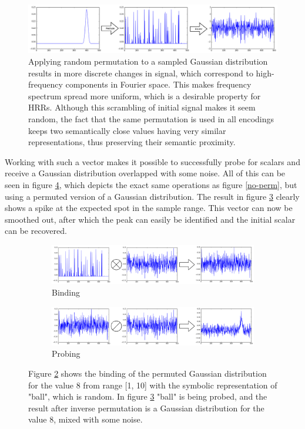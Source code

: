 \documentclass[conference]{IEEEtran}
\begin{document}
	\begin{figure}
		\includegraphics[width=\columnwidth]{img/scalar-perm-step-fft.png}
		\caption{Applying random permutation to a sampled Gaussian distribution results in more discrete changes in signal, which correspond to high-frequency components in Fourier space. This makes frequency spectrum spread more uniform, which is a desirable property for HRRs. Although this scrambling of initial signal makes it seem random, the fact that the same permutation is used in all encodings keeps two semantically close values having very similar representations, thus preserving their semantic proximity. }
		\label{perm-fft}
	\end{figure}
	
	Working with such a vector makes it possible to successfully probe for scalars and receive a Gaussian distribution overlapped with some noise.
All of this can be seen in figure \ref{perm}, which depicts the exact same operations as figure \ref{no-perm}, but using a permuted version of a Gaussian distribution.
The result in figure \ref{perm-b} clearly shows a spike at the expected spot in the sample range.
This vector can now be smoothed out, after which the peak can easily be identified and the initial scalar can be recovered.
	
	\begin{figure}
		\begin{subfigure}{1\columnwidth}
			\includegraphics[width=\columnwidth]{img/scalar-post-perm.png}
			\caption{Binding}
			\label{perm-a}
		\end{subfigure}
		\begin{subfigure}{1\columnwidth}
			\includegraphics[width=\columnwidth]{img/scalar-post-perm-probe.png}
			\caption{Probing}
			\label{perm-b}
		\end{subfigure}
		\caption{Figure \ref{perm-a} shows the binding of the permuted Gaussian distribution for the value 8 from range [1, 10] with the symbolic representation of "ball", which is random.
In figure \ref{perm-b} "ball" is being probed, and the result after inverse permutation is a Gaussian distribution for the value 8, mixed with some noise.}
		\label{perm}
	\end{figure}
	
\end{document}
